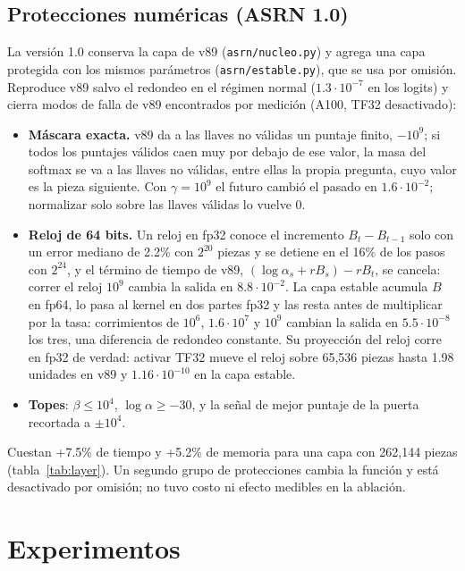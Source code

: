 \documentclass[11pt]{article}
\begin{document}
\subsection{Protecciones numéricas (ASRN 1.0)}
\label{sec:protections}
La versión 1.0 conserva la capa de v89 (\nolinkurl{asrn/nucleo.py}) y agrega una capa protegida con los mismos
parámetros (\nolinkurl{asrn/estable.py}), que se usa por omisión. Reproduce v89 salvo el redondeo en el régimen normal
($1.3\cdot10^{-7}$ en los logits) y cierra modos de falla de v89 encontrados por medición (A100, TF32 desactivado):
\begin{itemize}
\item \textbf{Máscara exacta.} v89 da a las llaves no válidas un puntaje finito, $-10^9$; si todos los puntajes válidos
  caen muy por debajo de ese valor, la masa del softmax se va a las llaves no válidas, entre ellas la propia pregunta,
  cuyo valor es la pieza siguiente. Con $\gamma=10^9$ el futuro cambió el pasado en $1.6\cdot10^{-2}$; normalizar solo
  sobre las llaves válidas lo vuelve 0.
\item \textbf{Reloj de 64 bits.} Un reloj en fp32 conoce el incremento $B_t-B_{t-1}$ solo con un error mediano de 2.2\%
  con $2^{20}$ piezas y se detiene en el 16\% de los pasos con $2^{24}$, y el término de tiempo de v89,
  $(\log\alpha_s+rB_s)-rB_t$, se cancela: correr el reloj $10^9$ cambia la salida en $8.8\cdot10^{-2}$. La capa estable
  acumula $B$ en fp64, lo pasa al kernel en dos partes fp32 y las resta antes de multiplicar por la tasa: corrimientos
  de $10^6$, $1.6\cdot10^7$ y $10^9$ cambian la salida en $5.5\cdot10^{-8}$ los tres, una diferencia de redondeo
  constante. Su proyección del reloj corre en fp32 de verdad: activar TF32 mueve el reloj sobre 65{,}536 piezas hasta
  1.98 unidades en v89 y $1.16\cdot10^{-10}$ en la capa estable.
\item \textbf{Topes}: $\beta\le10^4$, $\log\alpha\ge-30$, y la señal de mejor puntaje de la puerta recortada a
  $\pm10^4$.
\end{itemize}
Cuestan +7.5\% de tiempo y +5.2\% de memoria para una capa con 262{,}144 piezas (tabla~\ref{tab:layer}). Un segundo
grupo de protecciones cambia la función y está desactivado por omisión; no tuvo costo ni efecto medibles en la ablación.

\section{Experimentos}
\label{sec:experiments}
\end{document}
